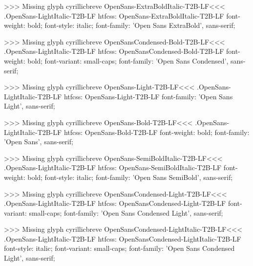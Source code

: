 >>>
Missing glyph	cyrillicbreve
\<OpenSans-ExtraBoldItalic-T2B-LF\><<<
.OpenSans-LightItalic-T2B-LF
htfcss:  OpenSans-ExtraBoldItalic-T2B-LF  font-weight: bold; font-style: italic; font-family: 'Open Sans ExtraBold', sans-serif;

>>>
Missing glyph	cyrillicbreve
\<OpenSansCondensed-Bold-T2B-LF\><<<
.OpenSans-LightItalic-T2B-LF
htfcss:  OpenSansCondensed-Bold-T2B-LF  font-weight: bold; font-variant: small-caps; font-family: 'Open Sans Condensed', sans-serif;

>>>
Missing glyph	cyrillicbreve
\<OpenSans-Light-T2B-LF\><<<
.OpenSans-LightItalic-T2B-LF
htfcss:  OpenSans-Light-T2B-LF  font-family: 'Open Sans Light', sans-serif;

>>>
Missing glyph	cyrillicbreve
\<OpenSans-Bold-T2B-LF\><<<
.OpenSans-LightItalic-T2B-LF
htfcss:  OpenSans-Bold-T2B-LF  font-weight: bold; font-family: 'Open Sans', sans-serif;

>>>
Missing glyph	cyrillicbreve
\<OpenSans-SemiBoldItalic-T2B-LF\><<<
.OpenSans-LightItalic-T2B-LF
htfcss:  OpenSans-SemiBoldItalic-T2B-LF  font-weight: bold; font-style: italic; font-family: 'Open Sans SemiBold', sans-serif;

>>>
Missing glyph	cyrillicbreve
\<OpenSansCondensed-Light-T2B-LF\><<<
.OpenSans-LightItalic-T2B-LF
htfcss:  OpenSansCondensed-Light-T2B-LF  font-variant: small-caps; font-family: 'Open Sans Condensed Light', sans-serif;

>>>
Missing glyph	cyrillicbreve
\<OpenSansCondensed-LightItalic-T2B-LF\><<<
.OpenSans-LightItalic-T2B-LF
htfcss:  OpenSansCondensed-LightItalic-T2B-LF  font-style: italic; font-variant: small-caps; font-family: 'Open Sans Condensed Light', sans-serif;

